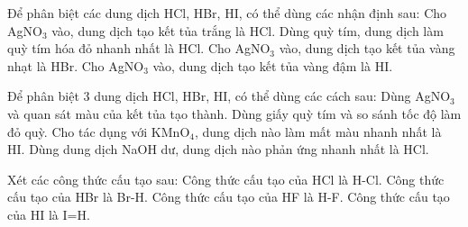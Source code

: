 \documentclass[Main.tex]{subfiles}
\begin{document}
    \begin{ex}
    Để phân biệt các dung dịch HCl, HBr, HI, có thể dùng các nhận định sau:
    \choiceTF
    {\True Cho AgNO$_3$ vào, dung dịch tạo kết tủa trắng là HCl.}
    {Dùng quỳ tím, dung dịch làm quỳ tím hóa đỏ nhanh nhất là HCl.}
    {\True Cho AgNO$_3$ vào, dung dịch tạo kết tủa vàng nhạt là HBr.}
    {\True Cho AgNO$_3$ vào, dung dịch tạo kết tủa vàng đậm là HI.}
    \end{ex}
    
    \begin{ex}
    Để phân biệt 3 dung dịch HCl, HBr, HI, có thể dùng các cách sau:
    \choiceTF
    {\True Dùng AgNO$_3$ và quan sát màu của kết tủa tạo thành.}
    {Dùng giấy quỳ tím và so sánh tốc độ làm đỏ quỳ.}
    {\True Cho tác dụng với KMnO$_4$, dung dịch nào làm mất màu nhanh nhất là HI.}
    {Dùng dung dịch NaOH dư, dung dịch nào phản ứng nhanh nhất là HCl.}
    \end{ex}
    
    \begin{ex}
    Xét các công thức cấu tạo sau:
    \choiceTF
    {\True Công thức cấu tạo của HCl là H-Cl.}
    {Công thức cấu tạo của HBr là Br-H.}
    {\True Công thức cấu tạo của HF là H-F.}
    {Công thức cấu tạo của HI là I=H.}
    \end{ex}
    
\end{document}

